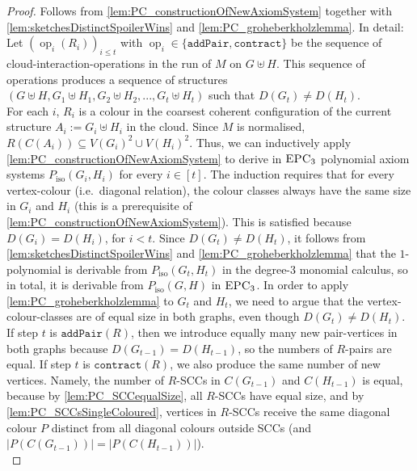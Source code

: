 \documentclass[a4paper,UKenglish,cleveref, autoref, thm-restate]{lipics-v2021}
\newcommand{\EPC}{\mbox{\sc EPC}}
\newcommand{\pairOp }{\texttt{addPair}}
\newcommand{\sccOp }{\texttt{contract}}
\newcommand{\op}{\operatorname{op}}
\newcommand{\Piso}{P_{\text{iso}}}
\begin{document}
	\begin{proof}
		Follows from \autoref{lem:PC_constructionOfNewAxiomSystem} together with \autoref{lem:sketchesDistinctSpoilerWins} and \autoref{lem:PC_groheberkholzlemma}. In detail: Let $(\op_i(R_i))_{i \leq t}$ with $\op_i \in \{\pairOp, \sccOp\}$ be the sequence of cloud-interaction-operations in the run of $M$ on $G \uplus H$. This sequence of operations produces a sequence of structures $(G \uplus H, G_1 \uplus H_1, G_2 \uplus H_2, ..., G_t \uplus H_t)$ such that $D(G_t) \neq D(H_t)$.\\
		For each $i$, $R_i$ is a colour in the coarsest coherent configuration of the current structure $A_i := G_i \uplus H_i$ in the cloud. Since $M$ is normalised, $R(C(A_i)) \subseteq V(G_i)^2 \cup V(H_i)^2$. Thus, we can inductively apply \autoref{lem:PC_constructionOfNewAxiomSystem} to derive in $\EPC_3$ polynomial axiom systems $\Piso(G_i,H_i)$ for every $i \in [t]$. 
		The induction requires that for every vertex-colour (i.e.\ diagonal relation), the colour classes always have the same size in $G_i$ and $H_i$ (this is a prerequisite of \autoref{lem:PC_constructionOfNewAxiomSystem}). This is satisfied because $D(G_i) = D(H_i)$, for $i < t$.
		Since $D(G_t) \neq D(H_t)$, it follows from \autoref{lem:sketchesDistinctSpoilerWins} and \autoref{lem:PC_groheberkholzlemma} that the $1$-polynomial is derivable from  $\Piso(G_t,H_t)$ in the degree-$3$ monomial calculus, so in total, it is derivable from $\Piso(G,H)$ in $\EPC_3$. In order to apply \autoref{lem:PC_groheberkholzlemma} to $G_t$ and $H_t$, we need to argue that the vertex-colour-classes are of equal size in both graphs, even though $D(G_t) \neq D(H_t)$. If step $t$ is $\pairOp(R)$, then we introduce equally many new pair-vertices in both graphs because $D(G_{t-1}) = D(H_{t-1})$, so the numbers of $R$-pairs are equal. If step $t$ is $\sccOp(R)$, we also produce the same number of new vertices. Namely, the number of $R$-SCCs in $C(G_{t-1})$ and $C(H_{t-1})$ is equal, because by \autoref{lem:PC_SCCequalSize}, all $R$-SCCs have equal size, and by \autoref{lem:PC_SCCsSingleColoured}, vertices in $R$-SCCs receive the same diagonal colour $P$ distinct from all diagonal colours outside SCCs (and $|P(C(G_{t-1}))| = |P(C(H_{t-1}))|$).\\   
		

\end{proof}
\end{document}
